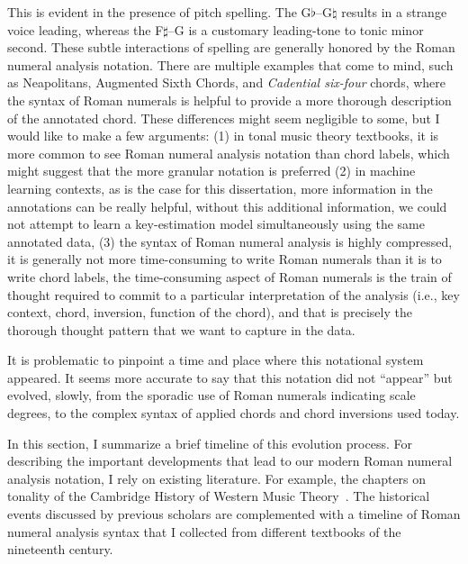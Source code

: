 This is evident in the presence of pitch spelling.
The G$\flat$--G$\natural$ results in a strange voice leading, whereas the F$\sharp$--G is a customary leading-tone to tonic minor second.
These subtle interactions of spelling are generally honored by the Roman numeral analysis notation.
There are multiple examples that come to mind, such as Neapolitans, Augmented Sixth Chords, and \emph{Cadential six-four} chords, where the syntax of Roman numerals is helpful to provide a more thorough description of the annotated chord.
These differences might seem negligible to some, but I would like to make a few arguments: (1) in tonal music theory textbooks, it is more common to see Roman numeral analysis notation than chord labels, which might suggest that the more granular notation is preferred (2) in machine learning contexts, as is the case for this dissertation, more information in the annotations can be really helpful, without this additional information, we could not attempt to learn a key-estimation model simultaneously using the same annotated data, (3) the syntax of Roman numeral analysis is highly compressed, it is generally not more time-consuming to write Roman numerals than it is to write chord labels, the time-consuming aspect of Roman numerals is the train of thought required to commit to a particular interpretation of the analysis (i.e., key context, chord, inversion, function of the chord), and that is precisely the thorough thought pattern that we want to capture in the data.


It is problematic to pinpoint a time and place where this notational system appeared.
It seems more accurate to say that this notation did not ``appear'' but evolved, slowly, from the sporadic use of Roman numerals indicating scale degrees, to the complex syntax of applied chords and chord inversions used today.

In this section, I summarize a brief timeline of this evolution process.
For describing the important developments that lead to our modern Roman numeral analysis notation, I rely on existing literature.
For example, the chapters on tonality of the Cambridge History of Western Music Theory~\parencite{christensen_tonality_2002, christensen_rameau_2002, christensen_nineteenth-century_2002, christensen_heinrich_2002}.
The historical events discussed by previous scholars are complemented with a timeline of Roman numeral analysis syntax that I collected from different textbooks of the nineteenth century.

